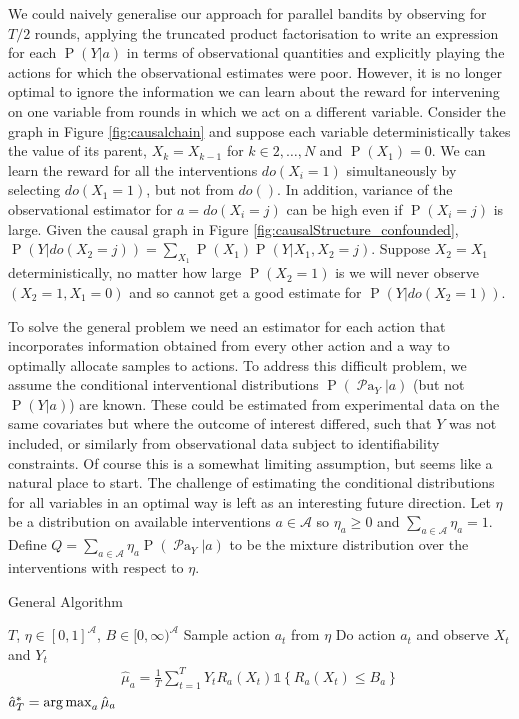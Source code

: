 \documentclass[11pt,a4paper,oneside]{book}
\newcommand{\calA}{\mathcal A}
\newcommand{\set}[1]{\left\{#1\right\}}
\newcommand{\ind}[1]{\mathds{1}\!\!\set{#1}}
\newcommand{\argmax}{\operatornamewithlimits{arg\,max}}
\newcommand{\eq}[1]{\begin{align*}#1\end{align*}}
\renewcommand{\P}[1]{\operatorname{P}\left(#1\right)}
\newcommand{\parents}[1]{\operatorname{\mathcal{P}a}_{#1}}
\theoremstyle{plain}
\theoremstyle{definition}
\begin{document}
We could naively generalise our approach for parallel bandits by observing for $T/2$ rounds, applying the truncated product factorisation to 
write an expression for each $\P{Y|a}$ in terms of observational quantities and explicitly playing the actions for which the observational 
estimates were poor. However, it is no longer optimal to ignore the information we can learn about the reward for intervening on one variable 
from rounds in which we act on a different variable. Consider the graph in Figure \ref{fig:causalchain} and suppose each variable deterministically 
takes the value of its parent, $X_k = X_{k-1}$ for $k\in {2,\ldots,N}$ and $\P{X_1} = 0$. We can learn the reward for all the interventions $do(X_i = 1)$ 
simultaneously by selecting $do(X_1 = 1)$, but not from $do()$. In addition, variance of the observational estimator for $a = do(X_i = j)$ can be 
high even if $\P{X_i = j}$ is large. Given the causal graph in Figure \ref{fig:causalStructure_confounded}, $\P{Y|do(X_2= j)} = \sum_{X_1}\P{X_1}\P{Y|X_1, X_2 = j}$. 
Suppose $X_2 = X_1$ deterministically, no matter how large $\P{X_2 = 1}$ is we will never observe $(X_2=1,X_1 = 0)$ and so cannot 
get a good estimate for $\P{Y|do(X_2=1)}$. 

To solve the general problem we need an estimator for each action that incorporates information obtained from every other action and a way to optimally 
allocate samples to actions. To address this difficult problem, we assume the conditional interventional distributions $\P{\parents{Y}|a}$ (but not $\P{Y|a}$) 
are known. These could be estimated from experimental data on the same covariates but where the outcome of interest differed, such that $Y$ was not included, 
or similarly from observational data subject to identifiability constraints. Of course this is a somewhat limiting assumption, but seems like a natural place to
start. The challenge of estimating the conditional distributions for all variables in an optimal way is left as an interesting future direction.
Let $\eta$ be a distribution on available interventions $a \in \calA$ so $\eta_a \geq 0$ and $\sum_{a \in \calA} \eta_a = 1$. 
Define $Q = \sum_{a \in \calA} \eta_a \P{\parents{Y}|a}$ to be the mixture distribution over the interventions with respect to $\eta$.



\begin{algorithm}[H]
\caption{General Algorithm}\label{alg:general}
\begin{algorithmic}
 $T$, $\eta \in [0,1]^{\calA}$, $B \in [0,\infty)^{\calA}$
\FOR{$t \in \set{1,\ldots,T}$}
\STATE Sample action $a_t$ from $\eta$
\STATE Do action $a_t$ and observe $X_t$ and $Y_t$
\ENDFOR
\FOR{$a \in \calA$}
\STATE
\eq {
\hat \mu_a =  \frac{1}{T} \sum_{t=1}^T Y_t R_a(X_t)  \ind{R_a(X_t) \leq B_a}
}
\ENDFOR
{} $\hat a^*_T = \argmax_a \hat \mu_a$
\end{algorithmic}
\end{algorithm}
\end{document}
